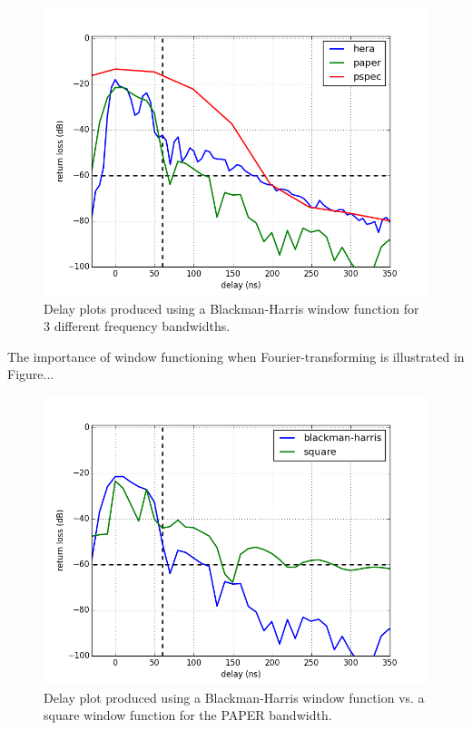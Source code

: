 \documentclass[12pt,preprint]{aastex}
\begin{document}
\begin{figure}
\centering
\includegraphics[totalheight=0.5\textheight]{plots/delay3_window.png}
\caption{Delay plots produced using a Blackman-Harris window function for 3 different frequency bandwidths.}
\end{figure}

The importance of window functioning when Fourier-transforming is illustrated in Figure...

\begin{figure}
\centering
\includegraphics[totalheight=0.5\textheight]{plots/bh_vs_sq.png}
\caption{Delay plot produced using a Blackman-Harris window function vs. a square window function for the PAPER bandwidth.}
\end{figure}
\end{document}
